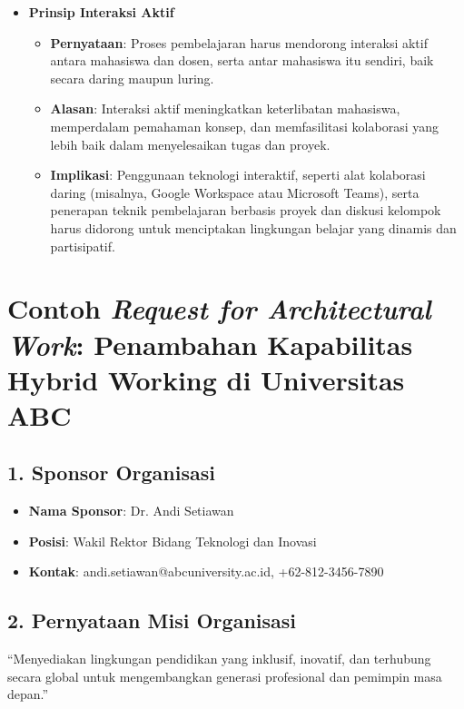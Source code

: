 \begin{itemize}
	\item \textbf{Prinsip Interaksi Aktif}
	\begin{itemize}
		\item \textbf{Pernyataan}: Proses pembelajaran harus mendorong interaksi aktif antara mahasiswa dan dosen, serta antar mahasiswa itu sendiri, baik secara daring maupun luring.
		\item \textbf{Alasan}: Interaksi aktif meningkatkan keterlibatan mahasiswa, memperdalam pemahaman konsep, dan memfasilitasi kolaborasi yang lebih baik dalam menyelesaikan tugas dan proyek.
		\item \textbf{Implikasi}: Penggunaan teknologi interaktif, seperti alat kolaborasi daring (misalnya, Google Workspace atau Microsoft Teams), serta penerapan teknik pembelajaran berbasis proyek dan diskusi kelompok harus didorong untuk menciptakan lingkungan belajar yang dinamis dan partisipatif.
	\end{itemize}
\end{itemize}

\section{Contoh \textit{Request for Architectural Work}: Penambahan Kapabilitas Hybrid Working di Universitas ABC}
\label{Request for Architectural Work}

\subsection*{1. Sponsor Organisasi}
\begin{itemize}
	\item \textbf{Nama Sponsor}: Dr. Andi Setiawan
	\item \textbf{Posisi}: Wakil Rektor Bidang Teknologi dan Inovasi
	\item \textbf{Kontak}: andi.setiawan@abcuniversity.ac.id, +62-812-3456-7890
\end{itemize}

\subsection*{2. Pernyataan Misi Organisasi}
“Menyediakan lingkungan pendidikan yang inklusif, inovatif, dan terhubung secara global untuk mengembangkan generasi profesional dan pemimpin masa depan.”

